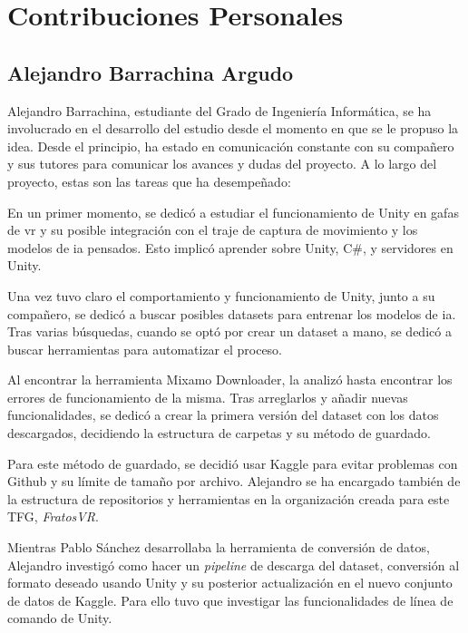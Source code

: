 \chapter*{Contribuciones Personales}
\label{cap:contribucionesPersonales}

\section*{Alejandro Barrachina Argudo}
Alejandro Barrachina, estudiante del Grado de Ingeniería Informática, se ha involucrado en el desarrollo del estudio desde el momento en que se le propuso la idea. Desde el principio, ha estado en comunicación constante con su compañero y sus tutores para comunicar los avances y dudas del proyecto. A lo largo del proyecto, estas son las tareas que ha desempeñado:

En un primer momento, se dedicó a estudiar el funcionamiento de Unity en gafas de \gls{vr} y su posible integración con el traje de captura de movimiento y los modelos de \gls{ia} pensados. Esto implicó aprender sobre Unity, C\#, y servidores en Unity.

Una vez tuvo claro el comportamiento y funcionamiento de Unity, junto a su compañero, se dedicó a buscar posibles datasets para entrenar los modelos de \gls{ia}. Tras varias búsquedas, cuando se optó por crear un dataset a mano, se dedicó a buscar herramientas para automatizar el proceso.

Al encontrar la herramienta Mixamo Downloader, la analizó hasta encontrar los errores de funcionamiento de la misma. Tras arreglarlos y añadir nuevas funcionalidades, se dedicó a crear la primera versión del dataset con los datos descargados, decidiendo la estructura de carpetas y su método de guardado.

Para este método de guardado, se decidió usar Kaggle para evitar problemas con Github y su límite de tamaño por archivo. Alejandro se ha encargado también de la estructura de repositorios y herramientas en la organización creada para este TFG, \textit{FratosVR}.

Mientras Pablo Sánchez desarrollaba la herramienta de conversión de datos, Alejandro investigó como hacer un \textit{pipeline} de descarga del dataset, conversión al formato deseado usando Unity y su posterior actualización en el nuevo conjunto de datos de Kaggle. Para ello tuvo que investigar las funcionalidades de línea de comando de Unity.

